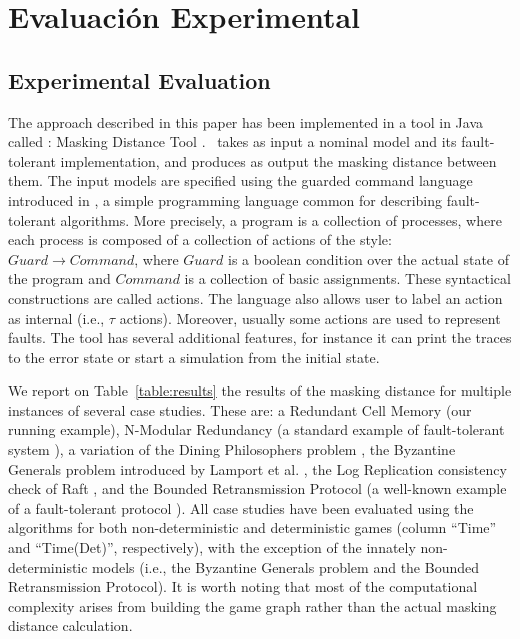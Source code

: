 \chapter{Evaluación Experimental}
\label{cap:experimentos}


\section{Experimental Evaluation} \label{sec:experimental_eval}

The approach described in this paper has been implemented in a tool in \textsf{Java} called \MaskD: 
Masking Distance Tool \cite{MaskD}. 
\MaskD~takes as input a nominal model and its fault-tolerant implementation, 
and produces as output the masking distance between them. 
The input models are specified using the guarded command language introduced in \cite{AroraGouda93}, a simple programming language common for describing fault-tolerant algorithms. 
More precisely, a program is a collection of processes, where each process is composed of a collection of actions of the style: $Guard \rightarrow Command$, where $Guard$ is a boolean condition over the actual state of the program and $Command$ is a collection of basic assignments. These syntactical constructions are called actions. The language also allows user to label 
an action as internal (i.e., $\tau$ actions). Moreover, usually some actions are used to represent faults. 
The tool has several additional features, for instance it can print the traces to the error state or start a simulation from the initial state.

We report on Table~\ref{table:results} the results of the masking distance for multiple instances 
of several case studies. These are: a Redundant Cell Memory (our running example), N-Modular Redundancy (a standard example of fault-tolerant system \cite{ShoomanBook}), a variation of the Dining Philosophers problem \cite{Dijkstra71}, the Byzantine 
Generals problem introduced by Lamport et al. \cite{LamportSP82}, the Log Replication consistency check of Raft \cite{OngaroO14}, and the Bounded Retransmission Protocol (a well-known example of a fault-tolerant  protocol \cite{GrooteP96}). All case studies have been evaluated using the algorithms for both non-deterministic and deterministic games (column ``Time'' and ``Time(Det)'', respectively), with the exception of the innately non-deterministic models (i.e., the Byzantine Generals problem and the Bounded Retransmission Protocol). It is worth noting that most of the computational complexity arises from building the game graph rather than the actual masking distance calculation.

